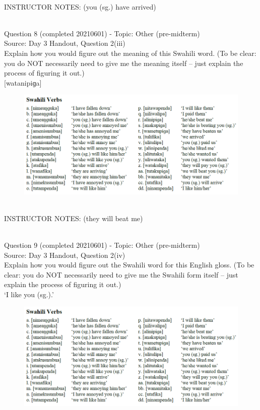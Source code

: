 \documentclass[12pt]{article}
\begin{document}
~\\
INSTRUCTOR NOTES: (you (sg.) have arrived)


~\\

{\large Question 8} (completed 20210601) - Topic: Other (pre-midterm)\\
Source: Day 3 Handout, Question 2(iii)\\

Explain how you would figure out the meaning of this Swahili word. (To be clear: you do NOT necessarily need to give me the meaning itself -- just explain the process of figuring it out.)\\

{[watanipiɡa]}

\begin{figure}[H]
\includegraphics{../images/swahiliverbs.png}
\end{figure}

~\\
INSTRUCTOR NOTES: (they will beat me)


~\\

{\large Question 9} (completed 20210601) - Topic: Other (pre-midterm)\\
Source: Day 3 Handout, Question 2(iv)\\

Explain how you would figure out the Swahili word for this English gloss. (To be clear: you do NOT necessarily need to give me the Swahili form itself -- just explain the process of figuring it out.)\\

‘I like you (sg.).’

\begin{figure}[H]
\includegraphics{../images/swahiliverbs.png}
\end{figure}
\end{document}
